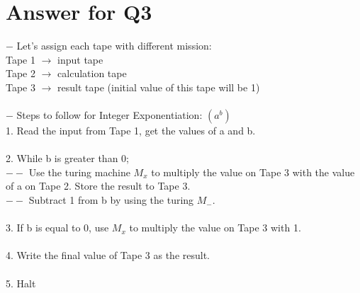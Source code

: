\documentclass[12pt]{article}
\begin{document}
\section*{Answer for Q3}

$-$ Let's assign each tape with different mission:\\
Tape 1 $\rightarrow$ input tape\\
Tape 2 $\rightarrow$ calculation tape\\
Tape 3 $\rightarrow$ result tape (initial value of this tape will be 1)\\
\\
$-$ Steps to follow for Integer Exponentiation: $(a^b)$\\
1. Read the input from Tape 1, get the values of a and b.\\
\\
2. While b is greater than 0;\\
$--$ Use the turing machine $M_x$ to multiply the value on Tape 3 with the value of a on Tape 2. Store the result to Tape 3.\\
$--$ Subtract 1 from b by using the turing $M_-$.\\
\\
3. If b is equal to 0, use $M_x$ to multiply the value on Tape 3 with 1.\\
\\
4. Write the final value of Tape 3 as the result.\\
\\
5. Halt\\  
\end{document}
